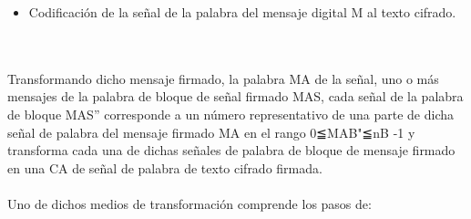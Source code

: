 \documentclass[12pt, a4paper]{article}
\begin{document}
	\begin{itemize}
		\item Codificación de la señal de la palabra del mensaje digital M al texto cifrado.
	\end{itemize}
	\\
	\\Transformando dicho mensaje firmado, la palabra MA de la señal, uno o más mensajes de la palabra de bloque de señal firmado MAS, cada señal de la palabra de bloque MAS” corresponde a un número representativo de una parte de dicha señal de palabra del mensaje firmado MA en el rango 0≦MAB"≦nB -1 y transforma cada una de dichas señales de palabra de bloque de mensaje firmado en una CA de señal de palabra de texto cifrado firmada.
	\\
	\\Uno de dichos medios de transformación comprende los pasos de:
\end{document}

